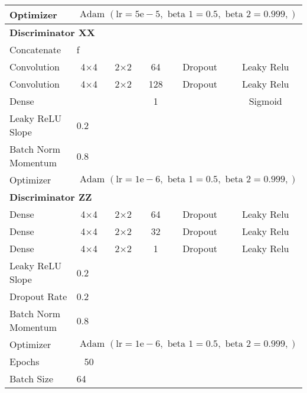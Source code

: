 \begin{longtable}[c]{@{}lccccc@{}}
	Optimizer & \multicolumn{5}{l}{$\text { Adam }(\mathrm{lr}=5 \mathrm{e}-5, \text { beta } 1=0.5, \text { beta } 2=0.999,)$} \\ \hline
	\multicolumn{6}{l}{\textbf{Discriminator XX}} \\
	Concatenate &\multicolumn{5}{l}{f} \\
	Convolution & \multicolumn{1}{c}{4$\times$4} & 2$\times$2 & 64 & Dropout & Leaky Relu \\
	Convolution & \multicolumn{1}{c}{4$\times$4} & 2$\times$2 & 128 & Dropout & Leaky Relu \\
	Dense & \multicolumn{1}{c}{} &  & 1 &  & Sigmoid \\ \hline
	Leaky ReLU Slope & \multicolumn{5}{l}{0.2} \\
	Batch Norm Momentum & \multicolumn{5}{l}{0.8} \\
	Optimizer & \multicolumn{5}{l}{$\text { Adam }(\mathrm{lr}=1 \mathrm{e}-6, \text { beta } 1=0.5, \text { beta } 2=0.999,)$} \\ \hline
	\multicolumn{6}{l}{\textbf{Discriminator ZZ}} \\
	Dense & \multicolumn{1}{c}{4$\times$4} & 2$\times$2 & 64 & Dropout & Leaky Relu \\
	Dense & \multicolumn{1}{c}{4$\times$4} & 2$\times$2 & 32 & Dropout & Leaky Relu \\
	Dense & \multicolumn{1}{c}{4$\times$4} & 2$\times$2 & 1 & Dropout & Leaky Relu \\ \hline
	Leaky ReLU Slope & \multicolumn{5}{l}{0.2} \\
	Dropout Rate & \multicolumn{5}{l}{0.2} \\
	Batch Norm Momentum & \multicolumn{5}{l}{0.8} \\
	Optimizer & \multicolumn{5}{l}{$\text { Adam }(\mathrm{lr}=1 \mathrm{e}-6, \text { beta } 1=0.5, \text { beta } 2=0.999,)$} \\ \hline
	Epochs & 50 & \multicolumn{1}{l}{} & \multicolumn{1}{l}{} & \multicolumn{1}{l}{} & \multicolumn{1}{l}{} \\
	Batch Size & \multicolumn{5}{l}{64}
\end{longtable}

\endgroup